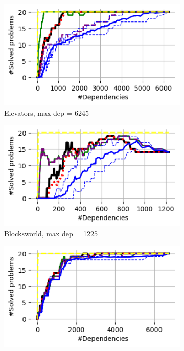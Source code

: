 \documentclass{article}
\theoremstyle{remark}
\begin{document}
\begin{figure}[t!]
\centering
\begin{subfigure}[b]{0.3\textwidth}
\centering
  \includegraphics[width=1\linewidth]{Results_graphs/Joint_Projection/With_Random/coverage_Joint_Projection_Elevators}
  \caption{Elevators, max dep = 6245}
  \label{fig:Elevators}
\end{subfigure}\hspace{1em}
\begin{subfigure}[b]{0.3\textwidth}
\centering
  \includegraphics[width=1\linewidth]{Results_graphs/Joint_Projection/With_Random/coverage_Joint_Projection_BlocksWorld}
  \caption{Blocksworld, max dep = 1225}
  \label{fig:Blocksworld}
\end{subfigure}\hspace{1em}
\begin{subfigure}[b]{0.3\textwidth}
\centering
  \includegraphics[width=1\linewidth]{Results_graphs/Joint_Projection/With_Random/coverage_Joint_Projection_Depot_not_trun}

\end{subfigure}
\end{figure}
\end{document}
